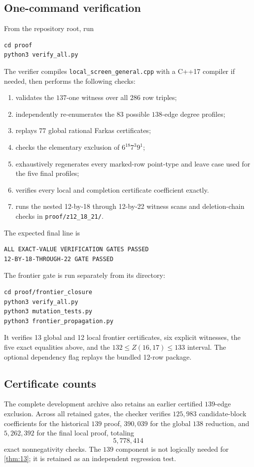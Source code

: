 \documentclass[11pt]{amsart}
\begin{document}
\subsection{One-command verification}
From the repository root, run
\begin{verbatim}
cd proof
python3 verify_all.py
\end{verbatim}
The verifier compiles \texttt{local\_screen\_general.cpp} with a C++17 compiler if needed, then performs the following checks:
\begin{enumerate}[label=\arabic*.]
\item validates the $137$-one witness over all $286$ row triples;
\item independently re-enumerates the $83$ possible $138$-edge degree profiles;
\item replays $77$ global rational Farkas certificates;
\item checks the elementary exclusion of $6^{18}7^3 9^1$;
\item exhaustively regenerates every marked-row point-type and leave case used for the five final profiles;
\item verifies every local and completion certificate coefficient exactly.
\item runs the nested 12-by-18 through 12-by-22 witness scans and deletion-chain checks in \texttt{proof/z12\_18\_21/}.
\end{enumerate}
The expected final line is
\begin{verbatim}
ALL EXACT-VALUE VERIFICATION GATES PASSED
12-BY-18-THROUGH-22 GATE PASSED
\end{verbatim}
The frontier gate is run separately from its directory:
\begin{verbatim}
cd proof/frontier_closure
python3 verify_all.py
python3 mutation_tests.py
python3 frontier_propagation.py
\end{verbatim}
It verifies 13 global and 12 local frontier certificates, six explicit
witnesses, the five exact equalities above, and the $132\le Z(16,17)\le133$
interval. The optional dependency flag replays the bundled 12-row package.

\subsection{Certificate counts}
The complete development archive also retains an earlier certified $139$-edge exclusion. Across all retained gates, the checker verifies $125{,}983$ candidate-block coefficients for the historical $139$ proof, $390{,}039$ for the global $138$ reduction, and $5{,}262{,}392$ for the final local proof, totaling
\[
 5{,}778{,}414
\]
exact nonnegativity checks. The $139$ component is not logically needed for \cref{thm:13}; it is retained as an independent regression test.
\end{document}
